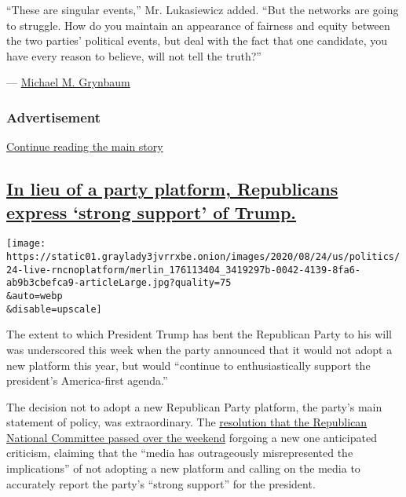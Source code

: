 ``These are singular events,'' Mr. Lukasiewicz added. ``But the networks
are going to struggle. How do you maintain an appearance of fairness and
equity between the two parties' political events, but deal with the fact
that one candidate, you have every reason to believe, will not tell the
truth?''

---
\href{https://www.nytimes3xbfgragh.onion/by/michael-m-grynbaum}{Michael
M. Grynbaum}

\hypertarget{advertisement-7}{%
\subsubsection{Advertisement}\label{advertisement-7}}

\protect\hyperlink{after-dfp-ad-mid8}{Continue reading the main story}

\hypertarget{in-lieu-of-a-party-platform-republicans-express-strong-support-of-trump}{%
\subsection{\texorpdfstring{\protect\hyperlink{in-lieu-of-a-party-platform-republicans-express-strong-support-of-trump}{In
lieu of a party platform, Republicans express `strong support' of
Trump.}}{In lieu of a party platform, Republicans express `strong support' of Trump.}}\label{in-lieu-of-a-party-platform-republicans-express-strong-support-of-trump}}

\texttt{[image: https://static01.graylady3jvrrxbe.onion/images/2020/08/24/us/politics/24-live-rncnoplatform/merlin\_176113404\_3419297b-0042-4139-8fa6-ab9b3cbefca9-articleLarge.jpg?quality=75\\\&auto=webp\\\&disable=upscale]}

The extent to which President Trump has bent the Republican Party to his
will was underscored this week when the party announced that it would
not adopt a new platform this year, but would ``continue to
enthusiastically support the president's America-first agenda.''

The decision not to adopt a new Republican Party platform, the party's
main statement of policy, was extraordinary. The
\href{https://prod-cdn-static.gop.com/docs/Resolution_Platform_2020.pdf?_ga=2.165306300.2055661719.1598124638-455285808.1584478680}{resolution
that the Republican National Committee passed over the weekend} forgoing
a new one anticipated criticism, claiming that the ``media has
outrageously misrepresented the implications'' of not adopting a new
platform and calling on the media to accurately report the party's
``strong support'' for the president.

